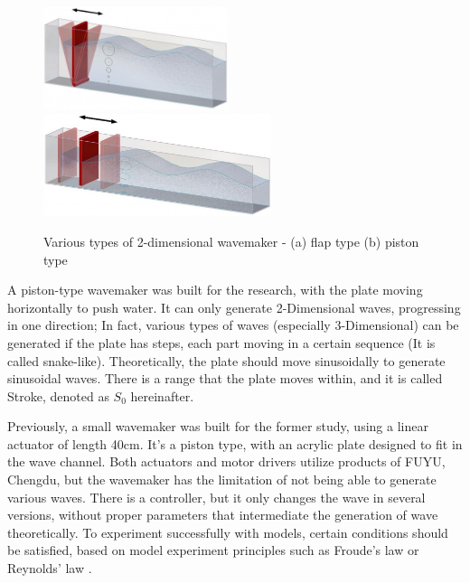 \begin{figure}[H]
    \begin{center}
        \includegraphics[height=3cm]{images/Wave_Maker(Flap).jpg}
        \includegraphics[height=3cm]{images/Wave_Maker(Piston).jpg}
    \end{center}
        \caption{Various types of 2-dimensional wavemaker - (a) flap type (b) piston type}
        \label{Experimnet_System} 
\end{figure}

A piston-type wavemaker was built for the research, with the plate moving horizontally to push water. It can only generate 2-Dimensional waves, progressing in one direction; In fact, various types of waves (especially 3-Dimensional) can be generated if the plate has steps, each part moving in a certain sequence (It is called snake-like). Theoretically, the plate should move sinusoidally to generate sinusoidal waves. There is a range that the plate moves within, and it is called Stroke, denoted as $S_0$ hereinafter.

Previously, a small wavemaker was built for the former study, using a linear actuator of length 40$\mathrm{cm}$. It's a piston type, with an acrylic plate designed to fit in the wave channel. Both actuators and motor drivers utilize products of FUYU, Chengdu, but the wavemaker has the limitation of not being able to generate various waves. There is a controller, but it only changes the wave in several versions, without proper parameters that intermediate the generation of wave theoretically. To experiment successfully with models, certain conditions should be satisfied, based on model experiment principles such as Froude's law or Reynolds' law \cite{briggs2013basics, chakrabarti1994offshore}.

